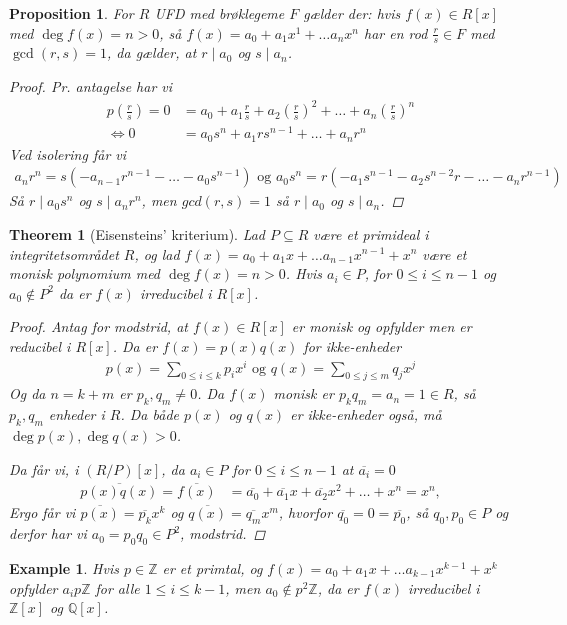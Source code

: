 \documentclass[10pt,twoside,openany,final]{memoir}
\theoremstyle{break}
\newtheorem{theorem}[section]{Theorem}
\newtheorem{proposition}[section]{Proposition}
\theoremstyle{Break}
\newtheorem{example}[section]{Example}
\newcommand{\Z}{\mathbb{Z}}
\newcommand{\Q}{\mathbb{Q}}
\begin{document}
\begin{proposition}
For $R$ UFD med brøklegeme $F$ gælder der: hvis $f(x) \in R[x]$ med $\deg f(x) =n > 0$, så $f(x)=a_0+a_1x^1+\dots a_n x^n$ har en rod $\frac{r}{s} \in F$ med $\gcd(r,s)=1$, da gælder, at $r \mid a_0$ og $s \mid a_n$.
\begin{proof}
Pr. antagelse har vi
\begin{align*}
p\left(\frac{r}{s}\right)=0&=a_0+a_1 \frac{r}{s}+a_2 \left(\frac{r}{s}\right)^2+\dots+a_n\left(\frac{r}{s}\right)^n\\
\iff 0&=a_0 s^n+a_1rs^{n-1}+\dots + a_n r^n
\end{align*}
Ved isolering får vi
\begin{align*}
a_n r^n = s(-a_{n-1}r^{n-1}-\dots-a_0s^{n-1}) \text{ og } a_0s^n=r(-a_1s^{n-1}-a_2s^{n-2}r-\dots-a_nr^{n-1})
\end{align*}
Så $r\mid a_0 s^n$ og $s \mid a_n r^n$, men $gcd(r,s)=1$ så $r \mid a_0$ og $s \mid a_n$.
\end{proof}
\end{proposition}

\begin{theorem}[Eisensteins' kriterium]
Lad $P\subseteq R$ være et primideal i integritetsområdet $R$, og lad $f(x)=a_0+a_1x+\dots a_{n-1}x^{n-1}+x^n$ være et monisk polynomium med $\deg f(x) = n > 0$. Hvis $a_i \in P$, for $0 \leq i \leq n-1$ og $a_0 \not \in P^2$ da er $f(x)$ irreducibel i $R[x]$.
\begin{proof}
Antag for modstrid, at $f(x) \in R[x]$ er monisk og opfylder men er reducibel i $R[x]$. Da er $f(x)=p(x)q(x)$ for ikke-enheder 
\begin{align*}
p(x)=\sum_{0 \leq i \leq k} p_i x^i \text{ og } q(x)=\sum_{0 \leq j \leq m} q_j x^j
\end{align*}
Og da $n=k+m$ er $p_k,q_m \neq 0$. Da $f(x)$ monisk er $p_k q_m = a_n = 1 \in R$, så $p_k,q_m$ enheder i $R$. Da både $p(x)$ og $q(x)$ er ikke-enheder også, må $\deg p(x), \deg q(x) > 0$.

Da får vi, i $(R/P)[x]$, da $a_i \in P$ for $0 \leq i \leq n-1$ at $\overline{a_i}=0$
\begin{align*}
\overline{p(x)q(x)}=\overline{f(x)}&=\overline{a_0}+\overline{a_1} x+\overline{a_2}x^2+\dots +x^n=x^n,
\end{align*}
Ergo får vi $\overline{p(x)}=\overline{p_k}x^k$ og $\overline{q(x)}=\overline{q_m}x^m$, hvorfor $\overline{q_0}=0=\overline{p_0}$, så $q_0,p_0 \in P$ og derfor har vi $a_0=p_0q_0 \in P^2$, modstrid.
\end{proof}
\end{theorem}

\begin{example}
Hvis $p \in \Z$ er et primtal, og $f(x)=a_0+a_1x+\dots a_{k-1}x^{k-1}+x^k$ opfylder $a_i p\Z$ for alle $1\leq i \leq k-1$, men $a_0 \not\in p^2 \Z$, da er $f(x)$ irreducibel i $\Z[x]$ og $\Q[x]$.
\end{example}
\end{document}
